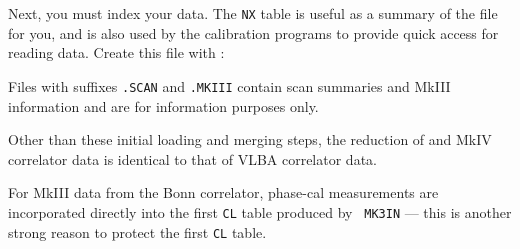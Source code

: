 
Next, you must index your data.  The {\tt NX} table is useful as a
summary of the file for you, and is also used by the calibration
programs to provide quick access for reading data.  Create this file
with {\tt {}}:
\pd

Files with suffixes {\tt .SCAN} and {\tt .MKIII} contain scan
summaries and MkIII information and are for information purposes only.

Other than these initial loading and merging steps, the reduction of
 and MkIV correlator data is identical to that of VLBA
correlator data.

For MkIII data from the Bonn correlator, phase-cal measurements are
incorporated directly into the first {\tt CL} table produced by {\tt
MK3IN} --- this is another strong reason to protect the first {\tt CL}
table.
